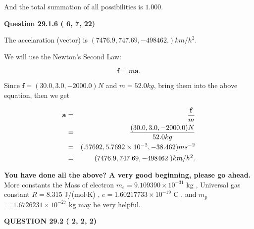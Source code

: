 \documentclass[12pt]{article}
\begin{document}
\noindent
 And the total summation of all possibilities is $  %
1.000 $.
 
 
 
  
\vspace{0.2in}
  
{\textbf{\Large{Question
29.1.6 
 (          6,          7,         22)
}}}
  
  
 
 
\noindent{}
 
 
The accelaration (vector) is
$(
7476.9,
747.69 ,
-498462.
)km/h^2.
$
 
 
 
 
 
 
\noindent{}

We will use the Newton's Second Law:
 
\[
\mathbf{f}=m\mathbf{a}.
\]
 
Since $\mathbf{f}=( %
30.0,  %
3.0,  %
-2000.0 )N$
and $m= %
52.0 kg$, bring them into the above equation, then we get
 
\begin{eqnarray*}
\mathbf{a}&=&\frac{\mathbf{f}}m  \\
&=&\frac{(
30.0 ,
3.0 ,
-2000.0 )N
}{ %
52.0 kg}  \\
&=&(
.57692 ,
5.7692 \times 10^{-2},
-38.462
)ms^{-2} \\
&=&(
7476.9 ,
747.69 ,
-498462.
)km/h^2.
\end{eqnarray*}
 
 
 
   
   
\vspace{0.3in}
{\textbf{\LARGE{You have done all the above? A very good beginning, please go ahead.}}}
More constants the
Mass of electron
$m_e$$ =
9.109390 \times 10^{-31} $
kg
,
Universal gas constant
$R$$ =
8.315 $
J/(mol$\cdot $K)
,
$e$$ =
1.60217733 \times 10^{-19} $
C
, and
$m_p$$ =
1.6726231 \times 10^{-27} $
kg
%
may be very helpful.
\vspace{0.3in}
   
   
  
\vspace{0.2in}
  
{\textbf{\Large{QUESTION
29.2 
 (          2,          2,          2)
}}}
  
  
 
 
\noindent{}
 
\end{document}
